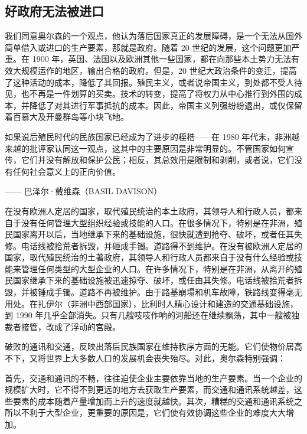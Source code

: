\subsection{好政府无法被进口}
我们同意奥尔森的一个观点，他认为落后国家真正的发展障碍，是一个无法从国外简单借入或进口的生产要素，那就是政府。随着 20 世纪的发展，这个问题更加严重。在 1900 年，英国、法国以及欧洲其他一些国家，都在向那些本土势力无法有效大规模运作的地区，输出合格的政府。但是，20 世纪大政治条件的变迁，提高了这种活动的成本，降低了其回报。殖民主义，或者说帝国主义，到处都不受人待见，也不再是一件划算的买卖。技术的转变，提高了将权力从中心推行到外围的成本，并降低了对其进行军事抵抗的成本。因此，帝国主义列强纷纷退出，或仅保留着百慕大及开曼群岛等小块飞地。

\begin{tcolorbox}
如果说后殖民时代的民族国家已经成为了进步的桎梏——在 1980 年代末，非洲越来越的批评家认同这一观点，这其中的主要原因是非常明显的。不管国家如何宣传，它们并没有解放和保护公民；相反，其总效用是限制和剥削，或者说，它们没有任何社会意义上的正向价值。
\begin{flushright}
—— 巴泽尔·戴维森（BASIL DAVISON）    
\end{flushright}
\end{tcolorbox}

在没有欧洲人定居的国家，取代殖民统治的本土政府，其领导人和行政人员，都来自于没有任何管理大型组织经验或技能的人口。在很多情况下，特别是在非洲，殖民国家离开以后，当地继承下来的基础设施，很快就遭到抢夺、破坏，或者任其失修。电话线被拾荒者拆毁，并砸成手镯。道路得不到维护。在没有被欧洲人定居的国家，取代殖民统治的土著政府，其领导人和行政人员都来自于没有什么经验或技能来管理任何类型的大型企业的人口。在许多情况下，特别是在非洲，从离开的殖民国家继承下来的基础设施被迅速掠夺、破坏，或任由其失修。电话线被拾荒者拆毁，并被锤成手镯。道路不再被维护。由于路基崩塌和机车故障，铁路线变得毫无用处。在扎伊尔（非洲中西部国家），比利时人精心设计和建造的交通基础设施，到 1990 年几乎全部消失。只有几艘吱吱作响的河船还在继续飘荡，其中一艘被独裁者接管，改成了浮动的宫殿。

破败的通讯和交通，反映出落后民族国家在维持秩序方面的无能。它们使物价居高不下，又将世界上大多数人口的发展机会丧失殆尽。对此，奥尔森特别强调：


\begin{tcolorbox}
首先，交通和通讯的不畅，往往迫使企业主要依靠当地的生产要素。当一个企业的规模扩大时，它不得不到更远的地方去获取生产要素，而交通和通讯系统越差，这些要素的成本随着产量增加而上升的速度就越快。其次，糟糕的交通和通讯系统之所以不利于大型企业，更重要的原因是，它们使有效协调这些企业的难度大大增加。 
\end{tcolorbox}

